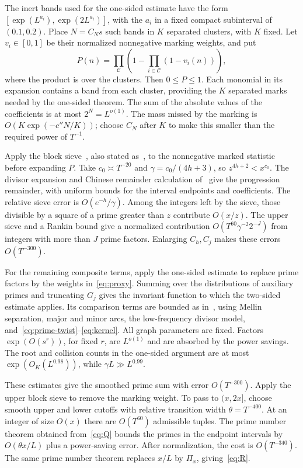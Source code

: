 \documentclass[10pt]{article}
\begin{document}
The inert bands used for the one-sided estimate have the form $[\exp(L^{a_i}),\exp(2L^{a_i})]$, with the $a_i$ in a fixed compact subinterval of $(0.1,0.2)$. Place $N=C_Ns$ such bands in $K$ separated clusters, with $K$ fixed. Let $v_i\in[0,1]$ be their normalized nonnegative marking weights, and put
\[
 P(n)=\prod_{\mathcal C}
          \left(1-\prod_{i\in\mathcal C}(1-v_i(n))\right),
\]
where the product is over the clusters. Then $0\leq P\leq1$. Each monomial in its expansion contains a band from each cluster, providing the $K$ separated marks needed by the one-sided theorem. The sum of the absolute values of the coefficients is at most $2^N=L^{o(1)}$. The mass missed by the marking is $O(K\exp(-c''N/K))$; choose $C_N$ after $K$ to make this smaller than the required power of $T^{-1}$.

Apply the block sieve~\cite[Lemma~2.9]{WD}, also stated as~\cite[Lemma~2.6]{PD}, to the nonnegative marked statistic before expanding $P$. Take $c_0\asymp T^{-20}$ and $\gamma=c_0/(4h+3)$, so $z^{4h+2}<x^{c_0}$. The divisor expansion and Chinese remainder calculation of~\cite[Lemma~7.2]{PD} give the progression remainder, with uniform bounds for the interval endpoints and coefficients. The relative sieve error is $O(e^{-h}/\gamma)$. Among the integers left by the sieve, those divisible by a square of a prime greater than $z$ contribute $O(x/z)$. The upper sieve and a Rankin bound give a normalized contribution $O(T^{60}\gamma^{-2}2^{-J})$ from integers with more than $J$ prime factors. Enlarging $C_h,C_j$ makes these errors $O(T^{-300})$.

For the remaining composite terms, apply the one-sided estimate to replace prime factors by the weights in~\eqref{eq:proxy}. Summing over the distributions of auxiliary primes and truncating $G_j$ gives the invariant function to which the two-sided estimate applies. Its comparison terms are bounded as in~\cite[Section~6]{PD}, using Mellin separation, major and minor arcs, the low-frequency divisor model, and~\eqref{eq:prime-twist}--\eqref{eq:kernel}. All graph parameters are fixed. Factors $\exp(O(s^r))$, for fixed $r$, are $L^{o(1)}$ and are absorbed by the power savings. The root and collision counts in the one-sided argument are at most $\exp(O_K(L^{0.98}))$, while $\gamma L\gg L^{0.99}$.

These estimates give the smoothed prime sum with error $O(T^{-300})$. Apply the upper block sieve to remove the marking weight. To pass to $(x,2x]$, choose smooth upper and lower cutoffs with relative transition width $\theta=T^{-400}$. At an integer of size $O(x)$ there are $O(T^{60})$ admissible tuples. The prime number theorem obtained from~\eqref{eq:Q} bounds the primes in the endpoint intervals by $O(\theta x/L)$ plus a power-saving error. After normalization, the cost is $O(T^{-340})$. The same prime number theorem replaces $x/L$ by $\Pi_x$, giving~\eqref{eq:R}.
\end{document}
